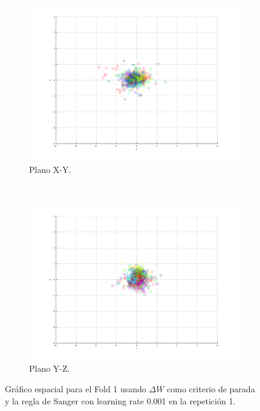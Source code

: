 \documentclass[informe.tex]{subfiles}
\begin{document}
\begin{figure}[H]
        \hspace*{-6.5cm}
        \begin{subfigure}[b]{0.49\textwidth}
                \includegraphics[width=\textwidth]{graficos/fold1_criterioParadap_reglas_alpha0_rep1_2XY.png}
                \caption{Plano X-Y.}
        \end{subfigure}
        ~
        \begin{subfigure}[b]{0.49\textwidth}
                \includegraphics[width=\textwidth]{graficos/fold1_criterioParadap_reglas_alpha0_rep1_3YZ.png}
                \caption{Plano Y-Z.}
        \end{subfigure}
	\restoregeometry
        \caption{Gráfico espacial para el Fold 1 usando $\Delta W$ como criterio de parada y la regla de Sanger con learning rate 0.001 en la repetición 1.}
        \label{fig:fold1_criterioParadap_reglas_alpha0_rep1}
	\end{figure}
      
\end{document}
